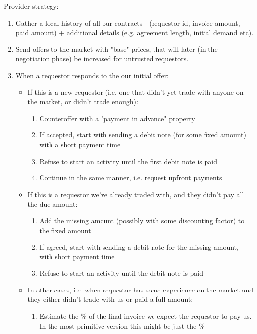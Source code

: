 \documentclass{article}
\begin{document}
Provider strategy:
\begin{enumerate}
    \item Gather a local history of all our contracts - (requestor id, invoice amount, paid amount) + additional details (e.g. agreement length, initial demand etc).
    \item Send offers to the market with "base" prices, that will later (in the negotiation phase) be increased for untrusted requestors.
    \item When a requestor responds to the our initial offer:
        \begin{itemize}
            \item If this is a new requestor (i.e. one that didn't yet trade with anyone on the market, or didn't trade enough):
                \begin{enumerate}
                    \item Counteroffer with a "payment in advance" property
                    \item If accepted, start with sending a debit note (for some fixed amount) with a short payment time
                    \item Refuse to start an activity until the first debit note is paid
                    \item Continue in the same manner, i.e. request upfront payments
                \end{enumerate}
            \item If this is a requestor we've already traded with, and they didn't pay all the due amount:
                \begin{enumerate}
                    \item Add the missing amount (possibly with some discounting factor) to the fixed amount
                    \item If agreed, start with sending a debit note for the missing amount, with short payment time
                    \item Refuse to start an activity until the debit note is paid
                \end{enumerate}
            \item In other cases, i.e. when requestor has some experience on the market and they either didn't trade with us or paid a full amount:
                \begin{enumerate}
                    \item Estimate the \% of the final invoice we expect the requestor to pay us. In the most primitive version this might be just the \%

\end{enumerate}
\end{itemize}
\end{enumerate}
\end{document}
